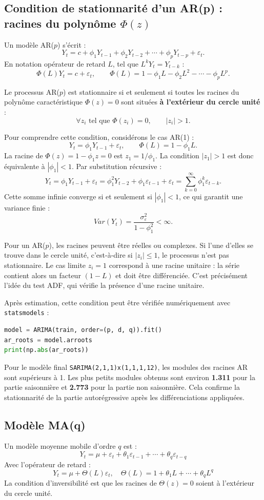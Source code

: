 \documentclass[12pt,a4paper]{report}
\begin{document}
\subsection{Condition de stationnarité d'un AR(p) : racines du polynôme $\Phi(z)$}
Un modèle AR($p$) s'écrit :
\[
Y_t = c + \phi_1Y_{t-1}+\phi_2Y_{t-2}+\cdots+\phi_pY_{t-p}+\varepsilon_t.
\]
En notation opérateur de retard $L$, tel que $L^kY_t=Y_{t-k}$ :
\[
\Phi(L)Y_t = c + \varepsilon_t, \qquad \Phi(L)=1-\phi_1L-\phi_2L^2-\cdots-\phi_pL^p.
\]

Le processus AR($p$) est stationnaire si et seulement si toutes les racines du polynôme caractéristique $\Phi(z)=0$ sont situées \textbf{à l'extérieur du cercle unité} :
\[
\forall z_i \text{ tel que } \Phi(z_i)=0, \qquad |z_i|>1.
\]

Pour comprendre cette condition, considérons le cas AR(1) :
\[
Y_t = \phi_1Y_{t-1}+\varepsilon_t, \qquad \Phi(L)=1-\phi_1L.
\]
La racine de $\Phi(z)=1-\phi_1z=0$ est $z_1=1/\phi_1$. La condition $|z_1|>1$ est donc équivalente à $|\phi_1|<1$. Par substitution récursive :
\[
Y_t = \phi_1Y_{t-1}+\varepsilon_t
     = \phi_1^2Y_{t-2}+\phi_1\varepsilon_{t-1}+\varepsilon_t
     = \sum_{k=0}^{\infty}\phi_1^k\varepsilon_{t-k}.
\]
Cette somme infinie converge si et seulement si $|\phi_1|<1$, ce qui garantit une variance finie :
\[
Var(Y_t)=\frac{\sigma^2_{\varepsilon}}{1-\phi_1^2}<\infty.
\]

Pour un AR($p$), les racines peuvent être réelles ou complexes. Si l'une d'elles se trouve dans le cercle unité, c'est-à-dire si $|z_i|\leq 1$, le processus n'est pas stationnaire. Le cas limite $z_i=1$ correspond à une racine unitaire : la série contient alors un facteur $(1-L)$ et doit être différenciée. C'est précisément l'idée du test ADF, qui vérifie la présence d'une racine unitaire.

Après estimation, cette condition peut être vérifiée numériquement avec \texttt{statsmodels} :
\begin{lstlisting}[language=Python]
model = ARIMA(train, order=(p, d, q)).fit()
ar_roots = model.arroots
print(np.abs(ar_roots))
\end{lstlisting}
Pour le modèle final \texttt{SARIMA(2,1,1)x(1,1,1,12)}, les modules des racines AR sont supérieurs à 1. Les plus petits modules obtenus sont environ \textbf{1.311} pour la partie saisonnière et \textbf{2.773} pour la partie non saisonnière. Cela confirme la stationnarité de la partie autorégressive après les différenciations appliquées.

\subsection{Modèle MA(q)}
Un modèle moyenne mobile d'ordre $q$ est :
\[
Y_t = \mu + \varepsilon_t + \theta_1\varepsilon_{t-1} + \cdots + \theta_q\varepsilon_{t-q}
\]
Avec l'opérateur de retard :
\[
Y_t = \mu + \Theta(L)\varepsilon_t, \quad \Theta(L)=1+\theta_1L+\cdots+\theta_qL^q
\]
La condition d'inversibilité est que les racines de $\Theta(z)=0$ soient à l'extérieur du cercle unité.
\end{document}
